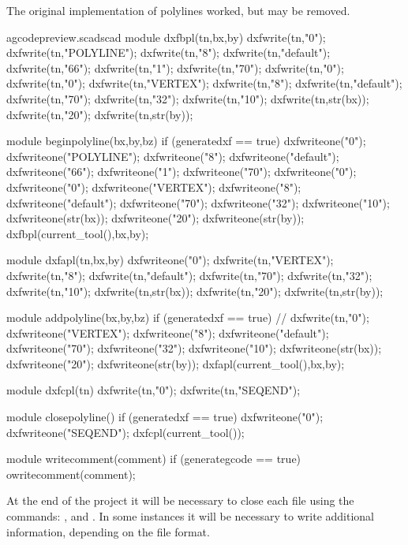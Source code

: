 \documentclass{ltxdoc}
\begin{document}
The original implementation of polylines worked, but may be removed.
 
\lstset{firstnumber=\thegcpscad}
\begin{writecode}{a}{gcodepreview.scad}{scad}
module dxfbpl(tn,bx,by) {
    dxfwrite(tn,"0");
    dxfwrite(tn,"POLYLINE");
    dxfwrite(tn,"8");
    dxfwrite(tn,"default");
    dxfwrite(tn,"66");
    dxfwrite(tn,"1");
    dxfwrite(tn,"70");
    dxfwrite(tn,"0");
    dxfwrite(tn,"0");
    dxfwrite(tn,"VERTEX");
    dxfwrite(tn,"8");
    dxfwrite(tn,"default");
    dxfwrite(tn,"70");
    dxfwrite(tn,"32");
    dxfwrite(tn,"10");
    dxfwrite(tn,str(bx));
    dxfwrite(tn,"20");
    dxfwrite(tn,str(by));
}

module beginpolyline(bx,by,bz) {
if (generatedxf == true) {
    dxfwriteone("0");
    dxfwriteone("POLYLINE");
    dxfwriteone("8");
    dxfwriteone("default");
    dxfwriteone("66");
    dxfwriteone("1");
    dxfwriteone("70");
    dxfwriteone("0");
    dxfwriteone("0");
    dxfwriteone("VERTEX");
    dxfwriteone("8");
    dxfwriteone("default");
    dxfwriteone("70");
    dxfwriteone("32");
    dxfwriteone("10");
    dxfwriteone(str(bx));
    dxfwriteone("20");
    dxfwriteone(str(by));
    dxfbpl(current_tool(),bx,by);}
}

module dxfapl(tn,bx,by) {
    dxfwriteone("0");
    dxfwrite(tn,"VERTEX");
    dxfwrite(tn,"8");
    dxfwrite(tn,"default");
    dxfwrite(tn,"70");
    dxfwrite(tn,"32");
    dxfwrite(tn,"10");
    dxfwrite(tn,str(bx));
    dxfwrite(tn,"20");
    dxfwrite(tn,str(by));
}

module addpolyline(bx,by,bz) {
if (generatedxf == true) {
//    dxfwrite(tn,"0");
    dxfwriteone("VERTEX");
    dxfwriteone("8");
    dxfwriteone("default");
    dxfwriteone("70");
    dxfwriteone("32");
    dxfwriteone("10");
    dxfwriteone(str(bx));
    dxfwriteone("20");
    dxfwriteone(str(by));
    dxfapl(current_tool(),bx,by);
    }
}

module dxfcpl(tn) {
    dxfwrite(tn,"0");
    dxfwrite(tn,"SEQEND");
}

module closepolyline() {
  if (generatedxf == true) {
    dxfwriteone("0");
    dxfwriteone("SEQEND");
    dxfcpl(current_tool());
  }
}

module writecomment(comment) {
  if (generategcode == true) {
    owritecomment(comment);
  }
}

\end{writecode}
\addtocounter{gcpscad}{92}
 
At the end of the project it will be necessary to close each file using the commands: 
, and
. %
In some instances it will be necessary to write additional information,
depending on the file format.
 
\end{document}
